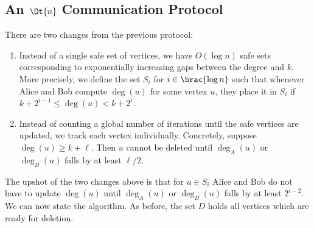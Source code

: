 \documentclass[11pt,letterpaper]{article}
\renewcommand{\geq}{\geqslant}
\renewcommand{\leq}{\leqslant}
\theoremstyle{definition}
\begin{document}
\subsection{An \texorpdfstring{$\Ot{n}$}{Õ(n)} Communication Protocol}

There are two changes from the previous protocol:
\begin{enumerate}
  \item 
    Instead of a single safe set of vertices, we have $O( \log n )$ safe sets
    corresponding to exponentially increasing gaps between the degree and $k$.
    More precisely, we define the set $S_i$ for $i \in \brac{\log n}$ such that
    whenever Alice and Bob compute $\deg(u)$ for some vertex $u$, they place it
    in $S_i$ if $k + 2^{i - 1} \leq \deg(u) < k + 2^i$.
  \item
    Instead of counting a global number of iterations until the safe vertices
    are updated, we track each vertex individually.
    Concretely, suppose $\deg(u) \geq k + \ell$.
    Then $u$ cannot be deleted until $\deg_A(u)$ or $\deg_B(u)$ falls by
    at least $\ell / 2$.
\end{enumerate}
The upshot of the two changes above is that for $u \in S_i$ Alice and Bob do not
have to update $\deg(u)$ until $\deg_A(u)$ or $\deg_B(u)$ falls by at least
$2^{i - 2}$.
We can now state the algorithm.
As before, the set $D$ holds all vertices which are ready for deletion.
\end{document}
